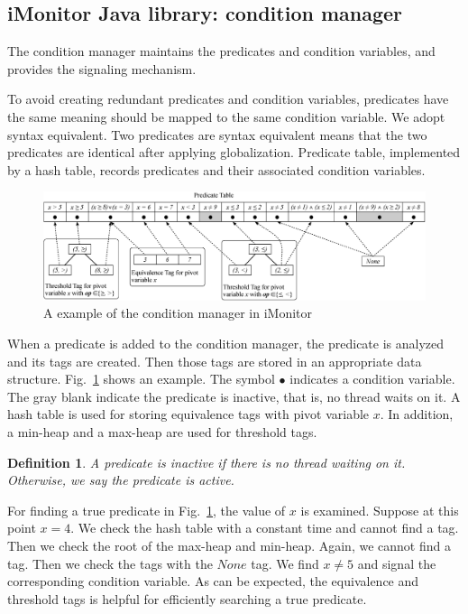 \documentclass[preprint]{sigplanconf}
\newtheorem{definition}{Definition}
\begin{document}
\subsection{iMonitor Java library: condition manager}
The condition manager maintains the predicates and condition variables, and
provides the signaling mechanism. 

To avoid creating redundant predicates and condition variables, predicates have 
the same meaning should be mapped to the same condition variable. We adopt 
syntax equivalent. Two predicates are syntax equivalent means that the two predicates
are identical after applying globalization. Predicate table, implemented by a
hash table, records predicates and their associated condition variables. 

\begin{figure}[ht!]
  \centering
  \includegraphics[width=180mm]{fig/manager.eps}
  \caption{A example of the condition manager in iMonitor}
  \label{fig:mgr}
\end{figure}


When a predicate is added to the condition manager, the predicate is analyzed
and its tags are created. Then those tags are stored in an appropriate data
structure. Fig.~\ref{fig:mgr} shows an example. The symbol $\bullet$ indicates 
a condition variable. The gray blank indicate the predicate is inactive,
that is, no thread waits on it. A hash table is used for
storing equivalence tags with pivot variable $x$. In addition, a min-heap and a
max-heap are used for threshold tags. 

\begin{definition}
    A predicate is inactive if there is no thread waiting on it. Otherwise, we
    say the predicate is active.
\end{definition}


For finding a true predicate in Fig.~\ref{fig:mgr}, the value of $x$ is 
examined. Suppose at this point $x=4$. We check the hash table with a
constant time and cannot find a tag. Then we check the root of the max-heap and 
min-heap. Again, we cannot find a tag. Then we check the tags with the $None$
tag. We find $x \ne 5$ and signal the corresponding condition variable. As can
be expected, the equivalence and threshold tags is helpful for efficiently
searching a true predicate.  
\end{document}
